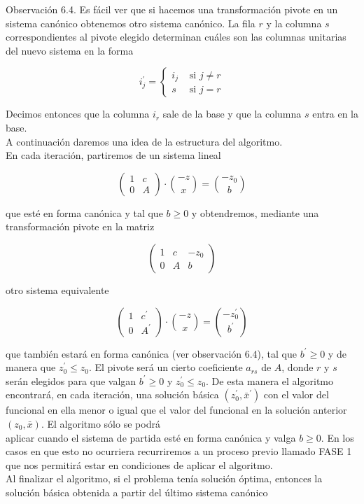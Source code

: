 \documentclass[10pt]{article}
\begin{document}
Observación 6.4. Es fácil ver que si hacemos una transformación pivote en un sistema canónico obtenemos otro sistema canónico. La fila $r$ y la columna $s$ correspondientes al pivote elegido determinan cuáles son las columnas unitarias del nuevo sistema en la forma

$$
i_{j}^{\prime}= \begin{cases}i_{j} & \text { si } j \neq r \\ s & \text { si } j=r\end{cases}
$$

Decimos entonces que la columna $i_{r}$ sale de la base y que la columna $s$ entra en la base.\\
A continuación daremos una idea de la estructura del algoritmo.\\
En cada iteración, partiremos de un sistema lineal

$$
\left(\begin{array}{cc}
1 & c \\
0 & A
\end{array}\right) \cdot\binom{-z}{x}=\binom{-z_{0}}{b}
$$

que esté en forma canónica y tal que $b \geq 0$ y obtendremos, mediante una transformación pivote en la matriz

$$
\left(\begin{array}{cc|c}
1 & c & -z_{0} \\
0 & A & b
\end{array}\right)
$$

otro sistema equivalente

$$
\left(\begin{array}{cc}
1 & c^{\prime} \\
0 & A^{\prime}
\end{array}\right) \cdot\binom{-z}{x}=\binom{-z_{0}^{\prime}}{b^{\prime}}
$$

que también estará en forma canónica (ver observación 6.4), tal que $b^{\prime} \geq 0$ y de manera que $z_{0}^{\prime} \leq z_{0}$. El pivote será un cierto coeficiente $a_{r s}$ de $A$, donde $r$ y $s$ serán elegidos para que valgan $b^{\prime} \geq 0$ y $z_{0}^{\prime} \leq z_{0}$. De esta manera el algoritmo encontrará, en cada iteración, una solución básica $\left(z_{0}^{\prime}, \bar{x}^{\prime}\right)$ con el valor del funcional en ella menor o igual que el valor del funcional en la solución anterior $\left(z_{0}, \bar{x}\right)$. El algoritmo sólo se podrá\\
aplicar cuando el sistema de partida esté en forma canónica y valga $b \geq 0$. En los casos en que esto no ocurriera recurriremos a un proceso previo llamado FASE 1 que nos permitirá estar en condiciones de aplicar el algoritmo.\\
Al finalizar el algoritmo, si el problema tenía solución óptima, entonces la solución básica obtenida a partir del último sistema canónico
\end{document}
